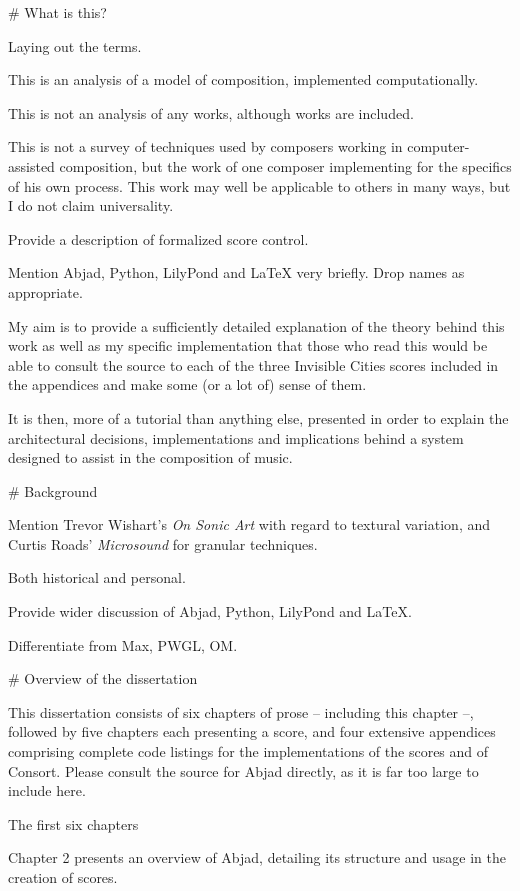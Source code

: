 \begin{markdown}

# What is this?

Laying out the terms.

This is an analysis of a model of composition, implemented computationally.

This is not an analysis of any works, although works are included.

This is not a survey of techniques used by composers working in
computer-assisted composition, but the work of one composer implementing for
the specifics of his own process. This work may well be applicable to others in
many ways, but I do not claim universality.

Provide a description of formalized score control.

Mention Abjad, Python, LilyPond and LaTeX very briefly. Drop names as
appropriate.

My aim is to provide a sufficiently detailed explanation of the theory behind
this work as well as my specific implementation that those who read
this would be able to consult the source to each of the three Invisible Cities
scores included in the appendices and make some (or a lot of) sense of them.

It is then, more of a tutorial than anything else, presented in order to
explain the architectural decisions, implementations and implications behind a
system designed to assist in the composition of music.

# Background

Mention Trevor Wishart's \emph{On Sonic Art} with regard to textural variation,
and Curtis Roads' \emph{Microsound} for granular techniques.

Both historical and personal.

Provide wider discussion of Abjad, Python, LilyPond and LaTeX.

Differentiate from Max, PWGL, OM.

# Overview of the dissertation

This dissertation consists of six chapters of prose -- including this chapter
--, followed by five chapters each presenting a score, and four extensive
appendices comprising complete code listings for the implementations of the
scores and of Consort. Please consult the source for Abjad directly, as it is
far too large to include here.

The first six chapters 

Chapter 2 presents an overview of Abjad, detailing its structure and usage in
the creation of scores.


\end{markdown}
